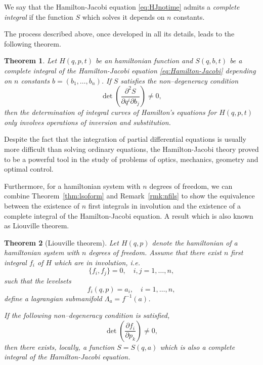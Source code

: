 \documentclass[english,fontsize=11pt,paper=b5]{scrbook}
\newtheorem{theorem}{Theorem}[chapter]
\theoremstyle{definition}
\begin{document}
    \begin{tcolorbox}
      We say that the Hamilton-Jacobi equation \eqref{eq:HJnotime} admits a \emph{complete integral} if the function $S$ which solves it depends on $n$ constants.
    \end{tcolorbox}


    The process described above, once developed in all its details, leads to the following theorem.

    \begin{theorem}
      Let $H(q,p,t)$ be an hamiltonian function and $S(q,b,t)$ be a complete integral of the Hamilton-Jacobi equation \eqref{eq:Hamilton-Jacobi} depending on $n$ constants $b=(b_1,\ldots,b_n)$. If $S$ satisfies the non--degeneracy condition
      \begin{equation}
        \det\left(\frac{\partial^2 S}{\partial q^i \partial b_j}\right) \neq 0,
      \end{equation}
      then the determination of integral curves of Hamilton's equations for $H(q,p,t)$ only involves operations of inversion and substitution.
    \end{theorem}

    Despite the fact that the integration of partial differential equations is usually more difficult than solving ordinary equations, the Hamilton-Jacobi theory proved to be a powerful tool in the study of problems of optics, mechanics, geometry and optimal control.

    Furthermore, for a hamiltonian system with $n$ degrees of freedom, we can combine Theorem~\ref{thm:lsoform} and Remark~\ref{rmk:nfils} to show the equivalence between the existence of $n$ first integrals in involution and the existence of a complete integral of the Hamilton-Jacobi equation.
    A result which is also known as Liouville theorem.

    \begin{theorem}[Liouville theorem]
      Let $H(q,p)$ denote the hamiltonian of a hamiltonian system with $n$ degrees of freedom.
      Assume that there exist $n$ first integral $f_i$ of $H$ which are in involution, i.e.
      \begin{equation}
        \big\{ f_i, f_j\big\} = 0, \quad i,j = 1,\ldots, n,
      \end{equation}
      such that the levelsets
      \begin{equation}
        f_i(q,p) = a_i, \quad i=1,\ldots,n,
      \end{equation}
      define a lagrangian submanifold $\Lambda_a = f^{-1}(a)$.

      If the following non--degeneracy condition is satisfied,
      \begin{equation}
        \det\left(\frac{\partial f_i}{\partial p_k}\right)\neq 0,
      \end{equation}
      then there exists, locally, a function $S=S(q,a)$ which is also a complete integral of the Hamilton-Jacobi equation.
    \end{theorem}
\end{document}
